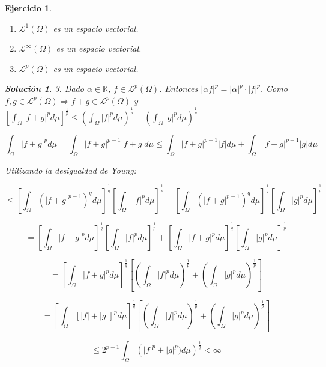 \documentclass[11pt, a4paper]{article}
\providecommand{\abs}[1]{\lvert#1\rvert}
\theoremstyle{theorem-style}
\theoremstyle{definition-style}
\newtheorem{ejer}{Ejercicio}[section]
\theoremstyle{remark-style}
\newtheorem*{sol}{Solución}
\theoremstyle{example-style}
\begin{document}
\begin{ejer}
  \begin{enumerate}
  \item $\mathcal L^{1} (\Omega)$ es un espacio vectorial.
  \item $\mathcal L^{\infty} (\Omega)$ es un espacio vectorial.
  \item $\mathcal L^{p} (\Omega)$ es un espacio vectorial.
  \end{enumerate}
  
  \begin{sol}
    
    3.
    Dado $\alpha \in \mathbb K$, $f \in \mathcal L^p (\Omega)$. Entonces $\abs{\alpha f}^p = \abs{\alpha}^p \cdot \abs{f}^p$.
    Como $f, g \in \mathcal L^p(\Omega) \Rightarrow f + g \in \mathcal L^p(\Omega)$ y $ \displaystyle \left[ \int_{\Omega} |f+g|^{p} d \mu \right]^{\frac{1}{p}} \leq \left( \int_{\Omega} |f|^{p} d \mu \right)^{\frac{1}{p}} + \left( \int_{\Omega} |g|^{p} d \mu \right)^{\frac{1}{p}}$	
    
    $$\int_{\Omega} \abs{f+g}^p d \mu = \int_{\Omega}\abs{f+g}^{p-1} \abs{f+g}d \mu \leq \int_{\Omega} \abs{f+g}^{p-1} \abs{f}d \mu + \int_{\Omega} \abs{f+g}^{p-1} \abs{g}d \mu$$
    
    Utilizando la desigualdad de Young:
    
    $$\leq \left[ \int_{\Omega} \left( |f+g|^{p-1} \right)^q d \mu \right]^{\frac{1}{q}} \left[ \int_{\Omega} |f|^{p} d \mu \right]^{\frac{1}{p}} + \left[ \int_{\Omega} \left( |f+g|^{p-1} \right)^q d \mu \right]^{\frac{1}{q}} \left[ \int_{\Omega} |g|^{p} d \mu \right]^{\frac{1}{p}}$$
    
    $$= \left[ \int_{\Omega} |f+g|^{p} d \mu \right]^{\frac{1}{q}} \left[ \int_{\Omega} |f|^{p} d \mu \right]^{\frac{1}{p}} + \left[ \int_{\Omega} |f+g|^{p} d \mu \right]^{\frac{1}{q}} \left[ \int_{\Omega} |g|^{p} d \mu \right]^{\frac{1}{p}}$$
    
    $$= \left[ \int_{\Omega} |f+g|^{p} d \mu \right]^{\frac{1}{q}} \left[ \left( \int_{\Omega} |f|^{p} d \mu \right)^{\frac{1}{p}} + \left( \int_{\Omega} |g|^{p} d \mu \right)^{\frac{1}{p}} \right]$$	
    
    $$= \left[ \int_{\Omega} \left[ |f|+|g| \right]^{p} d \mu \right]^{\frac{1}{q}} \left[ \left( \int_{\Omega} |f|^{p} d \mu \right)^{\frac{1}{p}} + \left( \int_{\Omega} |g|^{p} d \mu \right)^{\frac{1}{p}} \right]$$	
    
    $$ \leq 2^{p-1} \int_{\Omega} \left( |f|^p + |g|^p) d \mu \right)^{\frac{1}{q}} < \infty$$	
    
  \end{sol}

\end{ejer}
\end{document}
